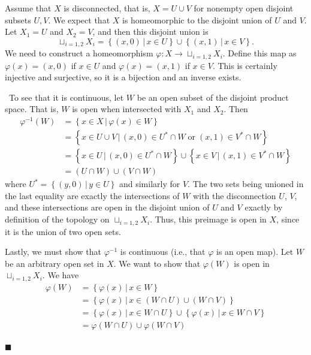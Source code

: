 \documentclass[12pt]{article}
\renewcommand{\qed}{\hfill$\blacksquare$}
\renewenvironment{proof}{\begin{addmargin}[1em]{0em}\begin{newproof}}{\end{newproof}\end{addmargin}\qed}
\begin{document}
\begin{proof}
Assume that $X$ is disconnected, that is, $X=U\cup V$ for nonempty open disjoint subsets $U,V$. We expect that $X$ is homeomorphic to the disjoint union of $U$ and $V$. Let $X_1 = U$ and $X_2=V$, and then this disjoint union is $$\sqcup_{i=1,2} X_i = \left\{ \left(x,0\right) \, | \, x\in U\right\}\cup\left\{ \left(x,1\right) \, | \, x\in V\right\}.$$ We need to construct a homeomorphism $\varphi:X \rightarrow \sqcup_{i=1,2} X_i$. Define this map as $\varphi\left(x\right) = \left(x,0\right)$ if $x\in U$ and $\varphi\left(x\right)=\left(x,1\right)$ if $x\in V$. This is certainly injective and surjective, so it is a bijection and an inverse exists.



\
To see that it is continuous, let $W$ be an open subset of the disjoint product space. That is, $W$ is open when intersected with $X_1$ and $X_2$. Then 
\begin{equation*}\begin{split}
\varphi^{-1}\left(W\right) & = \left\{ x\in X \, | \, \varphi\left(x\right) \in W\right\} \\
& = \left\{ x\in U\cup V \, | \, \left(x,0\right)\in U^*\cap W \; \text{or} \; \left(x,1\right)\in V^*\cap W \right\} \\
& = \left\{x \in U \, | \, \left(x,0\right) \in U^*\cap W\right\} \cup \left\{ x\in V \, | \, \left(x,1\right) \in V^* \cap W\right\} \\
& = \left(U\cap W\right)\cup \left(V\cap W\right)
\end{split}\end{equation*}
where $U^* = \left\{\left(y,0\right) \, | \, y\in U\right\}$ and similarly for $V$. The two sets being unioned in the last equality are exactly the intersections of $W$ with the disconnection $U$, $V$, and these intersections are open in the disjoint union of $U$ and $V$ exactly by definition of the topology on $\sqcup_{i=1,2} X_i$. Thus, this preimage is open in $X$, since it is the union of two open sets.

Lastly, we must show that $\varphi^{-1}$ is continuous (i.e., that $\varphi$ is an open map). Let $W$ be an arbitrary open set in $X$. We want to show that $\varphi\left(W\right)$ is open in $\sqcup_{i=1,2} X_i$. We have
\begin{equation*}
\begin{split}
\varphi\left(W\right) & = \left\{ \varphi\left(x\right) \, | \, x \in W\right\} \\
& = \left\{ \varphi\left(x\right) \, | \, x\in \left(W\cap U\right)\cup \left(W\cap V\right) \right\} \\
& = \left\{\varphi\left(x\right) \, | \, x\in W\cap U \right\}\cup\left\{\varphi\left(x\right) \, | \, x\in W\cap V \right\} \\
& = \varphi\left(W\cap U\right)\cup \varphi\left(W\cap V\right)\\
\end{split}
\end{equation*}
\end{proof}












\end{document}
